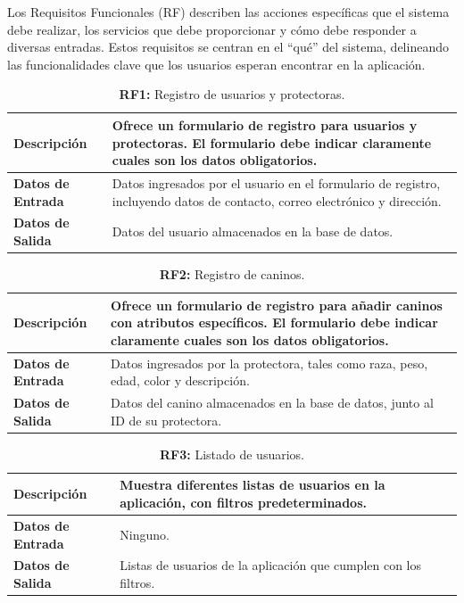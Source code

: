 \documentclass[a4paper, 12pt]{article}
\begin{document}
Los Requisitos Funcionales (RF) describen las acciones específicas que el sistema debe realizar, los servicios que debe proporcionar y cómo debe responder a diversas entradas. Estos requisitos se centran en el ``qué'' del sistema, delineando las funcionalidades clave que los usuarios esperan encontrar en la aplicación.

\begin{table}[H]
\captionsetup{list=no}%
\captionsetup{justification=raggedright,singlelinecheck=false}
\captionsetup{labelformat=empty}
\caption*{\textbf{RF1:} Registro de usuarios y protectoras.}
\label{tab:RF1}
	\begin{tabular}{|m{5cm}|m{10cm}|}
	\hline
	\textbf{Descripción} & Ofrece un formulario de registro para usuarios y protectoras. El formulario debe indicar claramente cuales son los datos obligatorios. \\ 
	\hline
	\textbf{Datos de Entrada} & Datos ingresados por el usuario en el formulario de registro, incluyendo datos de contacto, correo electrónico y dirección. \\ 
	\hline
	\textbf{Datos de Salida} & Datos del usuario almacenados en la base de datos. \\ 
	\hline
\end{tabular}
\end{table}

\begin{table}[H]
\captionsetup{list=no}%
\captionsetup{justification=raggedright,singlelinecheck=false}
\captionsetup{labelformat=empty}
\caption*{\textbf{RF2:} Registro de caninos.}
\label{tab:RF2}
	\begin{tabular}{|m{5cm}|m{10cm}|}
	\hline
	\textbf{Descripción} & Ofrece un formulario de registro para añadir caninos con atributos específicos. El formulario debe indicar claramente cuales son los datos obligatorios. \\ 
	\hline
	\textbf{Datos de Entrada} & Datos ingresados por la protectora, tales como raza, peso, edad, color y descripción. \\ 
	\hline
	\textbf{Datos de Salida} & Datos del canino almacenados en la base de datos, junto al ID de su protectora. \\ 
	\hline
\end{tabular}
\end{table}

\begin{table}[H]
\captionsetup{list=no}%
\captionsetup{justification=raggedright,singlelinecheck=false}
\captionsetup{labelformat=empty}
\caption*{\textbf{RF3:} Listado de usuarios.}
\label{tab:RF23}
	\begin{tabular}{|m{5cm}|m{10cm}|}
	\hline
	\textbf{Descripción} & Muestra diferentes listas de usuarios en la aplicación, con filtros predeterminados. \\ 
	\hline
	\textbf{Datos de Entrada} & Ninguno. \\ 
	\hline
	\textbf{Datos de Salida} & Listas de usuarios de la aplicación que cumplen con los filtros.  \\ 
	\hline
\end{tabular}
\end{table}
\end{document}

